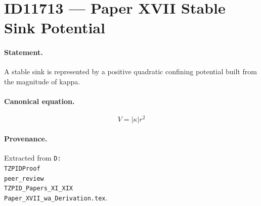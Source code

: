 \section*{ID11713 --- Paper XVII Stable Sink Potential}

\paragraph{Statement.}
A stable sink is represented by a positive quadratic confining potential built from the magnitude of kappa.

\paragraph{Canonical equation.}
\[
V=|\kappa|r^2
\]

\paragraph{Provenance.}
Extracted from \texttt{D:\\TZPIDProof\\peer\_review\\TZPID\_Papers\_XI\_XIX\\Paper\_XVII\_wa\_Derivation.tex}.
